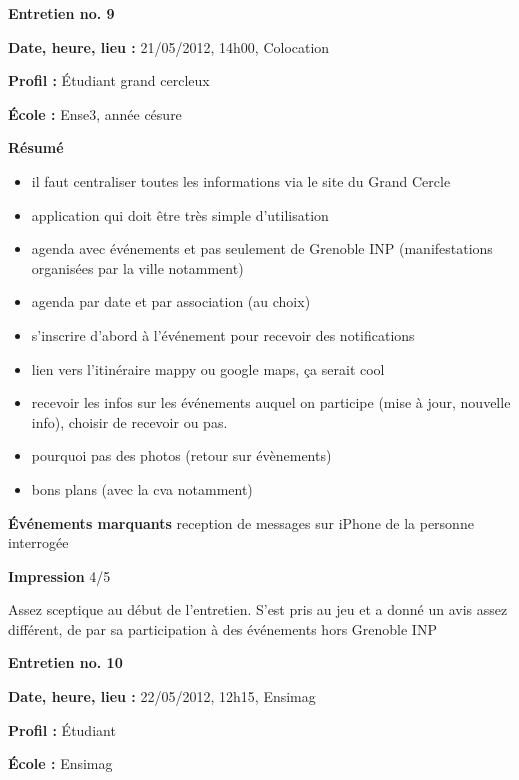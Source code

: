 \documentclass[a4paper, 11px]{article}
\begin{document}
 \textbf {\large Entretien no. 9}

\textbf{Date, heure, lieu : }
21/05/2012, 14h00, Colocation

\textbf{Profil : }
Étudiant grand cercleux

\textbf{École : }
Ense3, année césure

\textbf{Résumé}
	\begin{itemize}
		\item il faut centraliser toutes les informations via le site du Grand Cercle
		\item application qui doit être très simple d'utilisation
		\item agenda avec événements et pas seulement de Grenoble INP (manifestations organisées par la ville notamment)
		\item agenda par date et par association (au choix)
		\item s’inscrire d'abord à l’événement pour recevoir des notifications
		\item lien vers l’itinéraire mappy ou google maps, ça serait cool
		\item recevoir les infos sur les événements auquel on participe (mise à jour, nouvelle
     info), choisir de recevoir ou pas.
		\item pourquoi pas des photos (retour sur évènements)
		\item bons plans (avec la cva notamment)

	\end{itemize}

\textbf{Événements marquants}
reception de messages sur iPhone de la personne interrogée

\textbf{Impression}
4/5

Assez sceptique au début de l'entretien. S'est pris au jeu et a donné un avis assez différent, de par sa participation à des événements hors Grenoble INP



\vspace{.3cm}

 \textbf {\large Entretien no. 10}

\textbf{Date, heure, lieu : }
22/05/2012, 12h15, Ensimag

\textbf{Profil : }
Étudiant

\textbf{École : }
Ensimag
\end{document}

